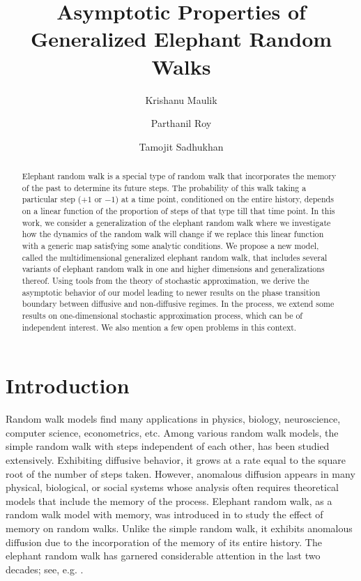 \documentclass[12pt]{amsart}
\title[Generalized Elephant Random Walks]{Asymptotic Properties of \\ Generalized Elephant Random Walks}
\author[K. Maulik]{Krishanu Maulik}
\author[P. Roy]{Parthanil Roy}
\author[T. Sadhukhan]{Tamojit Sadhukhan}
\theoremstyle{plain}
\theoremstyle{remark}
\numberwithin{equation}{section}
\begin{document}
\begin{abstract}
Elephant random walk is a special type of random walk that incorporates the memory of the past to determine its future steps. The probability of this walk taking a particular step ($+1$ or $-1$) at a time point, conditioned on the entire history, depends on a linear function of the proportion of steps of that type till that time point. {In this work, we consider a generalization of the elephant random walk where we investigate how the dynamics of the random walk will change if we replace this linear function with a generic map satisfying some analytic conditions. We propose a new model, called the multidimensional generalized elephant random walk, that includes several variants of elephant random walk in one and higher dimensions and generalizations thereof.} Using tools from the theory of stochastic approximation, we derive the asymptotic behavior of our model leading to newer results on the phase transition boundary between diffusive and {non-diffusive} regimes. In the process, we extend some results on one-dimensional stochastic approximation process, which can be of independent interest. We also mention a few open problems in this context.
\end{abstract}



\maketitle

\section{Introduction}\label{sec:intro}

Random walk models find many applications in physics, biology, neuroscience, computer science, econometrics, etc. Among various random walk models, the simple random walk with steps independent of each other, has been studied extensively. Exhibiting diffusive behavior, it grows at a rate equal to the square root of the number of steps taken. However, anomalous diffusion appears in many physical, biological, or social systems whose analysis often requires theoretical models that include the memory of the process. Elephant random walk, as a random walk model with memory, was introduced in \cite{erw1} to study the effect of memory on random walks. Unlike the simple random walk, it exhibits anomalous diffusion due to the incorporation of the memory of its entire history. The elephant random walk has garnered considerable attention in the last two decades; see, e.g. \cite{Bercu_2018, bertoin2022counting, 10.1063/1.4983566, Coletti_2017, Coletti_2021}. 
\end{document}
